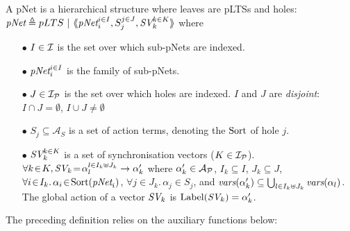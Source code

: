 \documentclass{lncs/llncs}
\def\AlgAS{\mathcal{A}_S}
\begin{document}
\begin{definition}[pNets]\label{def-pnets}
A pNet is a hierarchical structure where leaves are pLTSs and holes:\\
$\pNet\triangleq pLTS~|~\mylangle \pNet_i^{i\in I}, S_j^{j\in J}, \symb{SV}_k^{k\in K}\myrangle$
where
\begin{itemize}
\item[$\bullet$] $I \in \I$ is the set over which sub-pNets are indexed.
\item[$\bullet$] $\pNet_i^{i\in I}$ is the family of sub-pNets.

\item[$\bullet$] $J\in\I_\P$ is the set over which holes are indexed.
$I$ and $J$ are \emph{disjoint}: $I\cap J=\emptyset$,  $I\cup J\neq\emptyset$
\item[$\bullet$] $S_j \subseteq \AlgAS$ is a set of action terms, denoting the $\Sort$ of
hole $j$.

\item[$\bullet$] $\symb{SV}_k^{k\in K}$ is a set of
  synchronisation vectors ($K\in\I_\P$). $\forall k\!\in\! K,
  \symb{SV}_k\!=\!\alpha_{l}^{l\in I_k \uplus J_k}\to\alpha'_k$ where
  $\alpha'_k\in \mathcal{A}_\P$, $I_k\subseteq I$, $J_k\subseteq J$,
  $\forall i\!\in\!
  I_k.\,\alpha_{i}\!\in\!\Sort(\pNet_i)$,  $\forall j\!\in\!
  J_k.\,\alpha_{j}\!\in\!S_j$, and $\vars(\alpha'_k)\subseteq \bigcup_{l\in I_k\uplus 
  J_k}{\vars({\alpha_l})}$. The global action of a vector $\symb{SV}_k$ is
$\Label(\symb{SV}_k) = \alpha'_k$.


\end{itemize}
\end{definition}

The preceding definition relies on the auxiliary functions below:
\end{document}

